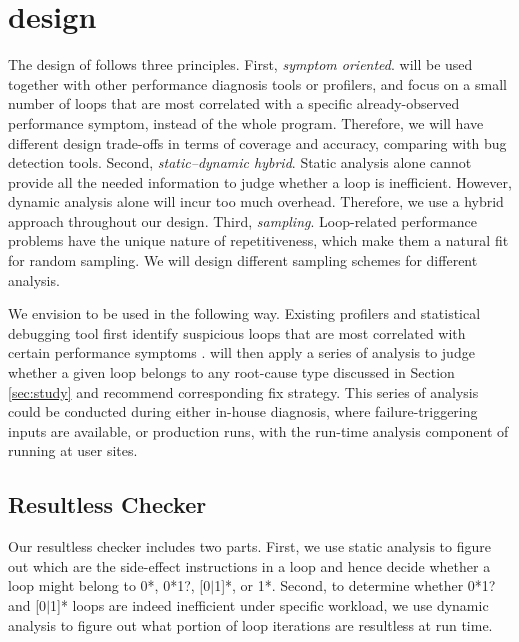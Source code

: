 \section{\Tool design}
\label{sec:design}
The design of \Tool follows three principles.
First, \textit{symptom oriented}. \Tool will be  
used together with other performance diagnosis tools \cite{SongOOPSLA2014}
or profilers,
and focus on a small
number of loops that are most correlated with a specific already-observed 
performance symptom,
instead of the whole program. Therefore, we will have different
design trade-offs in terms of coverage and accuracy, comparing with 
bug detection tools.
Second, \textit{static--dynamic hybrid}. Static analysis alone
cannot provide all the needed information to judge whether
a loop is inefficient. However, 
dynamic analysis alone will incur too much overhead.
Therefore, we use a hybrid approach throughout our design.
Third, \textit{sampling}. Loop-related 
performance problems have the unique nature of repetitiveness, which make 
them a natural fit for random sampling. We will design different
sampling schemes for different analysis.

We envision \Tool to be used in the following way.
Existing profilers and statistical debugging tool first
identify suspicious loops that are most correlated with 
certain performance 
symptoms \cite{SongOOPSLA2014}. 
\Tool will then apply a series of analysis to judge whether a given
loop belongs to any root-cause type discussed in Section \ref{sec:study}
and recommend corresponding fix strategy. This series of analysis could be
conducted during either in-house diagnosis, where failure-triggering inputs
are available, or production runs, with
the run-time analysis component of \Tool running at user sites.

\subsection{Resultless Checker}
\label{sec:workless}

Our resultless checker includes two parts. First, we use static analysis
to figure out which are the side-effect instructions in a loop and hence
decide whether a loop might belong to 0*, 0*1?, [0$|$1]*, or 1*. Second, to
determine whether 0*1? and [0$|$1]* loops are indeed inefficient
under specific workload, we use
dynamic analysis to figure out what portion of loop iterations are
resultless at run time.

